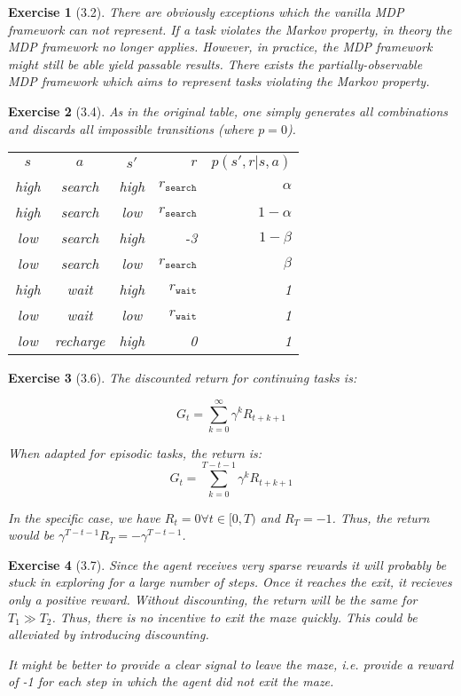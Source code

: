 \documentclass[a4paper]{scrartcl}
\theoremstyle{nonumberplain}
\newtheorem{ex}{Exercise}
\begin{document}
\begin{ex}[3.2]
There are obviously exceptions which the vanilla MDP framework can not represent. If a task violates the Markov property, in theory the MDP framework no longer applies. However, in practice, the MDP framework might still be able yield passable results. There exists the partially-observable MDP framework which aims to represent tasks violating the Markov property.
\end{ex}

\begin{ex}[3.4]
As in the original table, one simply generates all combinations and discards all impossible transitions (where $p=0$).

\begin{tabular}{c c c r r}
$s$ & $a$ & $s'$ & $r$ & $p(s',r|s,a)$\\
high & search & high & $r_{\texttt{search}}$ & $\alpha$\\
high & search & low & $r_{\texttt{search}}$ & $1-\alpha$\\
low & search & high & -3 & $1-\beta$\\
low & search & low & $r_{\texttt{search}}$ & $\beta$\\
high & wait & high & $r_{\texttt{wait}}$ & 1\\
low & wait & low & $r_{\texttt{wait}}$ & 1\\
low & recharge & high & 0 & 1\\
\end{tabular}
\end{ex}

\begin{ex}[3.6]
The discounted return for continuing tasks is:

\begin{equation}
G_t=\sum_{k=0}^{\infty}\gamma^k R_{t+k+1}
\end{equation}

When adapted for episodic tasks, the return is:
\begin{equation}
\label{eq:epireturn}
G_t=\sum_{k=0}^{T-t-1}\gamma^k R_{t+k+1}
\end{equation}

In the specific case, we have $R_t=0 \forall t \in [0,T)$ and $R_T=-1$. Thus, the return would be $\gamma^{T-t-1}R_T=-\gamma^{T-t-1}$.
\end{ex}

\begin{ex}[3.7]
Since the agent receives very sparse rewards it will probably be stuck in exploring for a large number of steps. Once it reaches the exit, it recieves only a positive reward. Without discounting, the return will be the same for $T_1\gg T_2$. Thus, there is no incentive to exit the maze quickly. This could be alleviated by introducing discounting.

It might be better to provide a clear signal to leave the maze, i.e. provide a reward of -1 for each step in which the agent did not exit the maze.
\end{ex}
\end{document}
